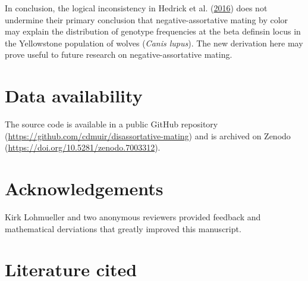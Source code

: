 \documentclass[
]{article}
\begin{document}
In conclusion, the logical inconsistency in Hedrick et al. (\protect\hyperlink{ref-hedrick_negative-assortative_2016}{2016}) does not undermine their primary conclusion that negative-assortative mating by color may explain the distribution of genotype frequencies at the beta definsin locus in the Yellowstone population of wolves (\emph{Canis lupus}). The new derivation here may prove useful to future research on negative-assortative mating.

\hypertarget{data-availability}{%
\section{Data availability}\label{data-availability}}

The source code is available in a public GitHub repository (\url{https://github.com/cdmuir/disassortative-mating}) and is archived on Zenodo (\url{https://doi.org/10.5281/zenodo.7003312}).

\hypertarget{acknowledgements}{%
\section{Acknowledgements}\label{acknowledgements}}

Kirk Lohmueller and two anonymous reviewers provided feedback and mathematical derviations that greatly improved this manuscript.

\hypertarget{literature-cited}{%
\section*{Literature cited}\label{literature-cited}}
\end{document}
